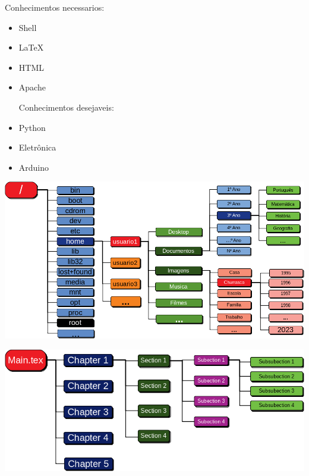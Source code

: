\begin{multicols}{2}
\Large Conhecimentos necessarios:
%


	\large
	\begin{itemize}
		\item Shell
		\item \LaTeX
		\item HTML
		\item Apache
		
		\vfill \null
		\columnbreak
		
		\Large Conhecimentos desejaveis:
		
		\item Python
		\item Eletrônica
		\item Arduino
	\end{itemize}
	
\end{multicols}
	\vfill \null
	\pagebreak

\begin{center}
	\includegraphics[height=\textheight]{./IMG-GIT/SVG/DIAGRAMAS.png}
\end{center}
\pagebreak

\begin{center}
	\includegraphics[width=\linewidth]{./IMG-GIT/SVG/DIAGRAMAS2.png}
\end{center}
\pagebreak


